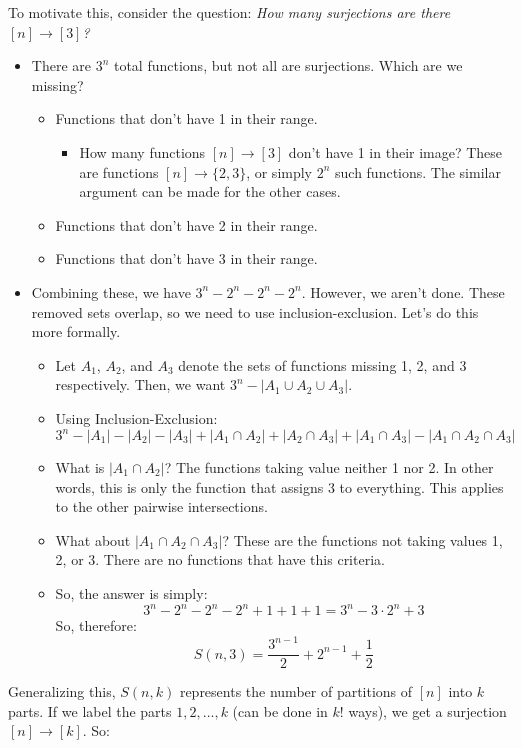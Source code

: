 \documentclass[letterpaper]{article}
\begin{document}
To motivate this, consider the question: \emph{How many surjections are there $[n] \to [3]$?}
\begin{itemize}
    \item There are $3^n$ total functions, but not all are surjections. Which are we missing?
    \begin{itemize}
        \item Functions that don't have 1 in their range.
        \begin{itemize}
            \item How many functions $[n] \to [3]$ don't have 1 in their image? These are functions $[n] \to \{2, 3\}$, or simply $2^n$ such functions. The similar argument can be made for the other cases. 
        \end{itemize}
        \item Functions that don't have 2 in their range.
        \item Functions that don't have 3 in their range. 
    \end{itemize}
    \item Combining these, we have $3^n - 2^n - 2^n - 2^n$. However, we aren't done. These removed sets overlap, so we need to use inclusion-exclusion. Let's do this more formally. 
    \begin{itemize}
        \item Let $A_1$, $A_2$, and $A_3$ denote the sets of functions missing 1, 2, and 3 respectively. Then, we want $3^n - |A_1 \cup A_2 \cup A_3|$.
        \item Using Inclusion-Exclusion:
        \[\boxed{3^n - |A_1| - |A_2| - |A_3| + |A_1 \cap A_2| + |A_2 \cap A_3| + |A_1 \cap A_3| - |A_1 \cap A_2 \cap A_3|}\]
        \item What is $|A_1 \cap A_2|$? The functions taking value neither 1 nor 2. In other words, this is only the function that assigns 3 to everything. This applies to the other pairwise intersections.
        \item What about $|A_1 \cap A_2 \cap A_3|$? These are the functions not taking values 1, 2, or 3. There are no functions that have this criteria. 
        \item So, the answer is simply:
        \[3^n - 2^n - 2^n - 2^n + 1 + 1 + 1 = \boxed{3^n - 3 \cdot 2^n + 3}\]
        So, therefore:
        \[\boxed{S(n, 3) = \frac{3^{n - 1}}{2} + 2^{n - 1} + \frac{1}{2}}\]
    \end{itemize}
\end{itemize}
Generalizing this, $S(n, k)$ represents the number of partitions of $[n]$ into $k$ parts. If we label the parts $1, 2, \dots, k$ (can be done in $k!$ ways), we get a surjection $[n] \to [k]$. So:
\end{document}
